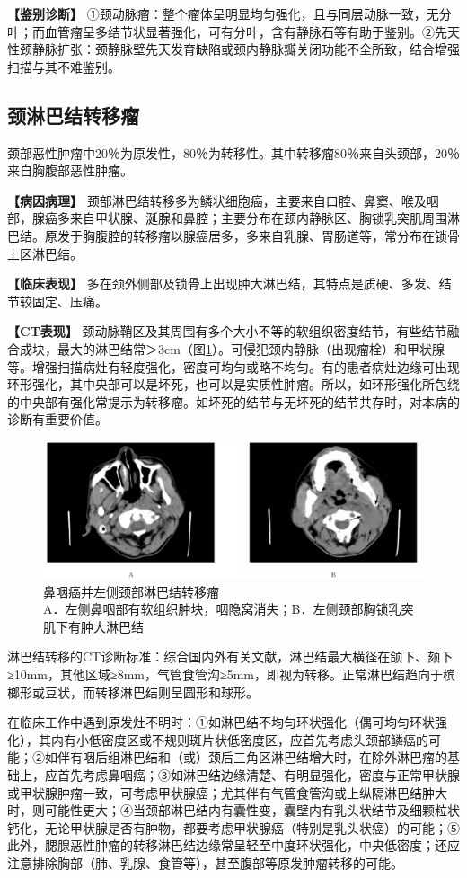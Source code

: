 \textbf{【鉴别诊断】}
①颈动脉瘤：整个瘤体呈明显均匀强化，且与同层动脉一致，无分叶；而血管瘤呈多结节状显著强化，可有分叶，含有静脉石等有助于鉴别。②先天性颈静脉扩张：颈静脉壁先天发育缺陷或颈内静脉瓣关闭功能不全所致，结合增强扫描与其不难鉴别。

\subsection{颈淋巴结转移瘤}

颈部恶性肿瘤中20％为原发性，80％为转移性。其中转移瘤80％来自头颈部，20％来自胸腹部恶性肿瘤。

\textbf{【病因病理】}
颈部淋巴结转移多为鳞状细胞癌，主要来自口腔、鼻窦、喉及咽部，腺癌多来自甲状腺、涎腺和鼻腔；主要分布在颈内静脉区、胸锁乳突肌周围淋巴结。原发于胸腹腔的转移瘤以腺癌居多，多来自乳腺、胃肠道等，常分布在锁骨上区淋巴结。

\textbf{【临床表现】}
多在颈外侧部及锁骨上出现肿大淋巴结，其特点是质硬、多发、结节较固定、压痛。

\textbf{【CT表现】}
颈动脉鞘区及其周围有多个大小不等的软组织密度结节，有些结节融合成块，最大的淋巴结常＞3cm（图\ref{fig8-5}）。可侵犯颈内静脉（出现瘤栓）和甲状腺等。增强扫描病灶有轻度强化，密度可均匀或略不均匀。有的患者病灶边缘可出现环形强化，其中央部可以是坏死，也可以是实质性肿瘤。所以，如环形强化所包绕的中央部有强化常提示为转移瘤。如坏死的结节与无坏死的结节共存时，对本病的诊断有重要价值。

\begin{figure}[!htbp]
 \centering
 \includegraphics[width=.7\textwidth,height=\textheight,keepaspectratio]{./images/Image00172.jpg}
 \captionsetup{justification=centering}
 \caption{鼻咽癌并左侧颈部淋巴结转移瘤\\{\small A．左侧鼻咽部有软组织肿块，咽隐窝消失；B．左侧颈部胸锁乳突肌下有肿大淋巴结}}
 \label{fig8-5}
  \end{figure} 

淋巴结转移的CT诊断标准：综合国内外有关文献，淋巴结最大横径在颌下、颏下≥10mm，其他区域≥8mm，气管食管沟≥5mm，即视为转移。正常淋巴结趋向于槟榔形或豆状，而转移淋巴结则呈圆形和球形。

在临床工作中遇到原发灶不明时：①如淋巴结不均匀环状强化（偶可均匀环状强化），其内有小低密度区或不规则斑片状低密度区，应首先考虑头颈部鳞癌的可能；②如伴有咽后组淋巴结和（或）颈后三角区淋巴结增大时，在除外淋巴瘤的基础上，应首先考虑鼻咽癌；③如淋巴结边缘清楚、有明显强化，密度与正常甲状腺或甲状腺肿瘤一致，可考虑甲状腺癌；尤其伴有气管食管沟或上纵隔淋巴结肿大时，则可能性更大；④当颈部淋巴结内有囊性变，囊壁内有乳头状结节及细颗粒状钙化，无论甲状腺是否有肿物，都要考虑甲状腺癌（特别是乳头状癌）的可能；⑤此外，腮腺恶性肿瘤的转移淋巴结边缘常呈轻至中度环状强化，中央低密度；还应注意排除胸部（肺、乳腺、食管等），甚至腹部等原发肿瘤转移的可能。

